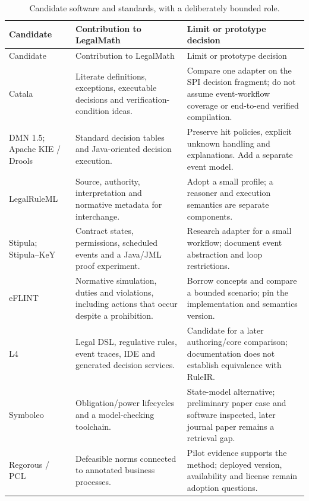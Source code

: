 \begingroup\small
\begin{longtable}{P{0.19\textwidth}P{0.37\textwidth}P{0.34\textwidth}}
\caption{Candidate software and standards, with a deliberately bounded role.}
\label{tab:software}\\
\toprule Candidate & Contribution to LegalMath & Limit or prototype decision \\\midrule
\endfirsthead
\toprule Candidate & Contribution to LegalMath & Limit or prototype decision \\\midrule
\endhead
Catala & Literate definitions, exceptions, executable decisions and verification-condition ideas. & Compare one adapter on the SPI decision fragment; do not assume event-workflow coverage or end-to-end verified compilation. \citep{catalacode}\\
DMN 1.5; Apache KIE / Drools & Standard decision tables and Java-oriented decision execution. & Preserve hit policies, explicit unknown handling and explanations. Add a separate event model. \citep{dmn2024,droolscode}\\
LegalRuleML & Source, authority, interpretation and normative metadata for interchange. & Adopt a small profile; a reasoner and execution semantics are separate components. \citep{legalruleml2021}\\
Stipula; Stipula--KeY & Contract states, permissions, scheduled events and a Java/JML proof experiment. & Research adapter for a small workflow; document event abstraction and loop restrictions. \citep{stipulacode,stipulakeycode}\\
eFLINT & Normative simulation, duties and violations, including actions that occur despite a prohibition. & Borrow concepts and compare a bounded scenario; pin the implementation and semantics version. \citep{eflint2026}\\
L4 & Legal DSL, regulative rules, event traces, IDE and generated decision services. & Candidate for a later authoring/core comparison; documentation does not establish equivalence with RuleIR. \citep{l4code}\\
Symboleo & Obligation/power lifecycles and a model-checking toolchain. & State-model alternative; preliminary paper case and software inspected, later journal paper remains a retrieval gap. \citep{symboleo2020,symboleocode}\\
Regorous / PCL & Defeasible norms connected to annotated business processes. & Pilot evidence supports the method; deployed version, availability and license remain adoption questions. \citep{semanticcompliance2016}\\

\end{longtable}
